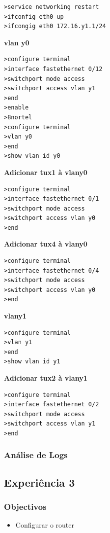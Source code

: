 \documentclass[a4paper,11pt]{article}
\begin{document}
\begin{lstlisting}
>service networking restart
>ifconfig eth0 up
>ifcongig eth0 172.16.y1.1/24
\end{lstlisting}

\textbf{vlan y0}

\begin{lstlisting}
>configure terminal
>interface fastethernet 0/12
>switchport mode access
>switchport access vlan y1
>end
>enable
>8nortel
>configure terminal
>vlan y0
>end
>show vlan id y0
\end{lstlisting}

\textbf{Adicionar tux1 à vlany0}

\begin{lstlisting}
>configure terminal
>interface fastethernet 0/1
>switchport mode access
>switchport access vlan y0
>end
\end{lstlisting}

\textbf{Adicionar tux4 à vlany0}

\begin{lstlisting}
>configure terminal
>interface fastethernet 0/4
>switchport mode access
>switchport access vlan y0
>end
\end{lstlisting}

\textbf{vlany1}
\begin{lstlisting}
>configure terminal
>vlan y1
>end
>show vlan id y1
\end{lstlisting}

\textbf{Adicionar tux2 à vlany1}

\begin{lstlisting}
>configure terminal
>interface fastethernet 0/2
>switchport mode access
>switchport access vlan y1
>end
\end{lstlisting}

\subsubsection{Análise de Logs}

\subsection{Experiência 3}
\subsubsection{Objectivos}

\begin{itemize}
\item Configurar o router
\end{itemize}
\end{document}
